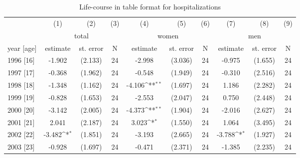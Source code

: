 \begin{table}[H] \centering 
	\begin{threeparttable} \centering \caption{Life-course in table format for hospitalizations}\label{rev_mlch: lc_table_hospital}
		{\def\sym#1{\ifmmode^{#1}\else\(^{#1}\)\fi} 
			\begin{tabular}{l*{9}{c}}
				\toprule 
				&\multicolumn{1}{c}{(1)}&\multicolumn{1}{c}{(2)}&\multicolumn{1}{c}{(3)}&\multicolumn{1}{c}{(4)}&\multicolumn{1}{c}{(5)}&\multicolumn{1}{c}{(6)}&\multicolumn{1}{c}{(7)}&\multicolumn{1}{c}{(8)}&\multicolumn{1}{c}{(9)}\\
				& \multicolumn{3}{c}{total} & \multicolumn{3}{c}{women} & \multicolumn{3}{c}{men} \\ 
				\cmidrule(lr){2-4}\cmidrule(lr){5-7}\cmidrule(lr){8-10}
				\multicolumn{1}{c}{year [age]}&\multicolumn{1}{c}{estimate}&\multicolumn{1}{c}{st. error}&\multicolumn{1}{c}{N}&\multicolumn{1}{c}{estimate}&\multicolumn{1}{c}{st. error}&\multicolumn{1}{c}{N}&\multicolumn{1}{c}{estimate}&\multicolumn{1}{c}{st. error}&\multicolumn{1}{c}{N}\\
				\midrule
				1996 [16]           &      -1.902         &     (2.133)	& 24	&      -2.998         &     (3.036)		& 24	&      -0.975         &     (1.655)		& 24\\
				1997 [17]           &      -0.368         &     (1.962)	& 24	&      -0.548         &     (1.949)		& 24	&      -0.310         &     (2.516)		& 24\\
				1998 [18]           &      -1.348         &     (1.162)	& 24	&      -4.106\sym{**} &     (1.697)		& 24	&       1.186         &     (2.282)		& 24\\
				1999 [19]           &      -0.828         &     (1.653)	& 24	&      -2.553         &     (2.047)		& 24	&       0.750         &     (2.448)		& 24\\
				2000 [20]           &      -3.142         &     (2.005)	& 24	&      -4.373\sym{**} &     (1.904)		& 24	&      -2.016         &     (2.627)		& 24\\
				2001 [21]           &       2.041         &     (2.187)	& 24	&       3.023\sym{*}  &     (1.550)		& 24	&       1.064         &     (3.495)		& 24\\
				2002 [22]           &      -3.482\sym{*}  &     (1.851)	& 24	&      -3.193         &     (2.665)		& 24	&      -3.788\sym{*}  &     (1.927)		& 24\\
				2003 [23]           &      -0.928         &     (1.697)	& 24	&      -0.471         &     (2.371)		& 24	&      -1.385         &     (2.235)		& 24\\

\end{tabular}}
\end{threeparttable}
\end{table}
